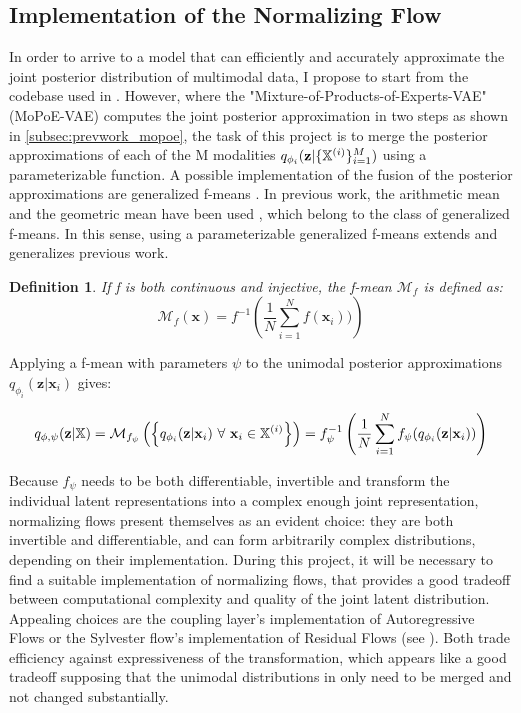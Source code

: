 \documentclass[english]{scrartcl}
\newtheorem{definition}{Definition}
\begin{document}
    \subsection{Implementation of the Normalizing Flow}
    In order to arrive to a model that can efficiently and accurately approximate the joint posterior distribution of multimodal data, I propose to start from the codebase used in \citet{sutter_generalized_2020}.
    However, where the "Mixture-of-Products-of-Experts-VAE" (MoPoE-VAE) computes the joint posterior approximation in two steps as shown in \cref{subsec:prevwork_mopoe}, the task of this project is to merge the posterior approximations of each of the M modalities $q_{\phi_i}(\textbf{z}|\{\mathbb{X}^{(i)}\}_{i=1}^M)$ using a parameterizable function.
    A possible implementation of the fusion of the posterior approximations are generalized f-means \citep{niculescu_convex_2018}.
    In previous work, the arithmetic mean and the geometric mean have been used  \citep[PoE,MoE,MoPoE]{wu_multimodal_2018,shi_variational_2019,sutter_generalized_2020}, which belong to the class of generalized f-means.
    In this sense, using a parameterizable generalized f-means extends and generalizes previous work.
    \begin{definition}
        If f is both continuous and injective, the f-mean $\mathcal{M}_f$ is defined as:
        \begin{equation}
             \mathcal{M}_{f}\left( \textbf{x} \right) = f^{-1}\left( \frac{1}{N} \sum ^N _{i=1} f(\textbf{x}_i)) \right)
        \end{equation}
    \end{definition}

    Applying a f-mean with parameters $\psi$ to the unimodal posterior approximations $q_{\phi _i}(\textbf{z}|\textbf{x}_i)$ gives:

    \begin{equation}\label{eq:merge_function}
        q_{\phi, \psi}(\textbf{z} | \mathbb{X}) = \mathcal{M}_{f_{\psi}}\left( \left\{ q_{\phi _i}(\textbf{z}|\textbf{x}_i)\ \forall\ \textbf{x}_i \in \mathbb{X}^{(i)} \right\} \right) = f_{\psi}^{-1}\left( \frac{1}{N} \sum ^N _{i=1} f_{\psi}(q_{\phi _i}(\textbf{z}|\textbf{x}_i)) \right)
    \end{equation}

    Because $f_{\psi}$ needs to be both differentiable, invertible and transform the individual latent representations into a complex enough joint representation, normalizing flows present themselves as an evident choice:
    they are both invertible and differentiable, and can form arbitrarily complex distributions, depending on their implementation.
    During this project, it will be necessary to find a suitable implementation of normalizing flows, that provides a good tradeoff between computational complexity and quality of the joint latent distribution.
    Appealing choices are the coupling layer's implementation of Autoregressive Flows or the Sylvester flow's implementation of Residual Flows (see ).
    Both trade efficiency against expressiveness of the transformation, which appears like a good tradeoff supposing that the unimodal distributions in  only need to be merged and not changed substantially.
\end{document}
